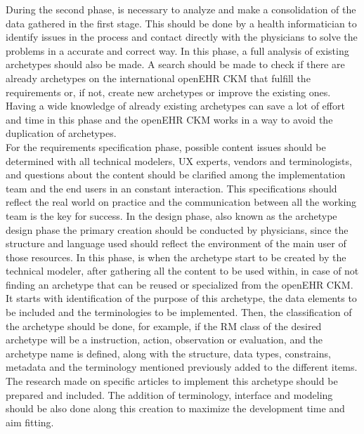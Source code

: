 \documentclass[mim_thesis.tex]{subfiles}
\begin{document}
During the second phase, is necessary to analyze and make a consolidation of the data gathered in the first stage. This should be done by a health informatician to identify issues in the process and contact directly with the physicians to solve the problems in a accurate and correct way. In this phase, a full analysis of existing archetypes should also be made. A search should be made to check if there are already archetypes on the international openEHR CKM that fulfill the requirements or, if not, create new archetypes or improve the existing ones. Having a wide knowledge of already existing archetypes can save a lot of effort and time in this phase and the openEHR CKM works in a way to avoid the duplication of archetypes. \\

For the requirements specification phase, possible content issues should be determined with all technical modelers, \ac{UX} experts, vendors and terminologists, and questions about the content should be clarified among the implementation team and the end users in an constant interaction. This specifications should reflect the real world on practice \citep{hovenga2013health} and the communication between all the working team is the key for success. In the design phase, also known as the archetype design phase \citep{Madsen2010} \citep{beale2007archetype} the primary creation should be conducted by physicians, since the structure and language used should reflect the environment of the main user of those resources. In this phase, is when the archetype start to be created by the technical modeler, after gathering all the content to be used within, in case of not finding an archetype that can be reused or specialized from the openEHR CKM. It starts with identification of the purpose of this archetype, the data elements to be included and the terminologies to be implemented. Then, the classification of the archetype should be done, for example, if the RM class of the desired archetype will be a instruction, action, observation or evaluation, and the archetype name is defined, along with the structure, data types, constrains, metadata and the terminology mentioned previously added to the different items. The research made on specific articles to implement this archetype should be prepared and included. The addition of terminology, interface and modeling should be also done along this creation to maximize the development time and aim fitting. \\
\end{document}
